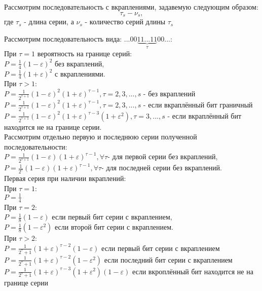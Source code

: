 \documentclass[a4paper,12pt]{article}
\theoremstyle{plain}
\begin{document}
	Рассмотрим последовательность с вкраплениями, задавемую следующим образом:
	\begin{equation}
	\tau_s - \nu_s, 
	\end{equation}
где $\tau_s$ - длина серии, а $\nu_s$ - количество серий длины $\tau_s$

Рассмотрим последовательность вида: $...00\underbrace{11...11}_{\text{$\tau$}}00...$:\\
При $\tau=1$ вероятность на границе серий:\\
 $P=\frac{1}{4}(1-\varepsilon)^2$  без вкраплений, \\
  $P=\frac{1}{4}(1+\varepsilon)^2$  с вкраплениями. \\
 При $\tau>1$:\\
 $P=\frac{1}{2^{\tau+1}}(1-\varepsilon)^2(1+\varepsilon)^{\tau-1}, \tau=2,3,...,s$ - без вкраплений\\
 $P=\frac{1}{2^{\tau+1}}(1-\varepsilon)^2(1+\varepsilon)^{\tau-1}, \tau=2,3,...,s$ - если вкраплённый бит граничный\\
 $P=\frac{1}{2^{\tau+1}}(1-\varepsilon)^2(1+\varepsilon)^{\tau-3}(1+\varepsilon^2), \tau=3,...,s$ - если вкраплённый бит находится не на границе серии.\\
Рассмотрим отдельно первую и последнюю серии полученной последовательности:\\
$P=\frac{1}{2^{\tau+1}}(1-\varepsilon)(1+\varepsilon)^{\tau-1}, \forall\tau$- для первой серии без вкраплений,\\
$P=\frac{1}{2^{\tau}}(1-\varepsilon)(1+\varepsilon)^{\tau-1}, \forall\tau$- для последней серии без вкраплений.\\
Первая серия при наличии вкраплений:\\
При $\tau=1$:\\
$P=\frac{1}{4}$\\
При $\tau=2$:\\
$P=\frac{1}{8}(1-\varepsilon)$  если первый бит серии с вкраплением,\\
$P=\frac{1}{8}(1-\varepsilon^2)$  если второй бит серии с вкраплением.\\
При $\tau>2$:\\
$P=\frac{1}{2^\tau+1}(1+\varepsilon)^{\tau-2}(1-\varepsilon)$ если первый бит серии с вкраплением\\
$P=\frac{1}{2^\tau+1}(1+\varepsilon)^{\tau-2}(1-\varepsilon^2)$ если последний бит серии с вкраплением\\
$P=\frac{1}{2^\tau+1}(1+\varepsilon)^{\tau-3}(1+\varepsilon^2)(1-\varepsilon)$ если вкроплённый бит находится не на границе серии\\
\end{document}
